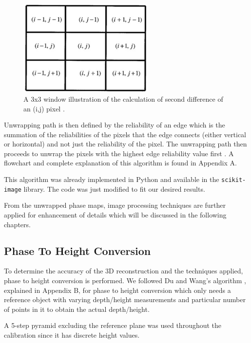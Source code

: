 \captionsetup[figure]{width=5in}
\begin{figure}[h!]
	\centering
	\includegraphics[width=0.6\textwidth]{figures/pixels.jpg}
	\caption{A 3x3 window illustration of the calculation of second difference of an (i,j) pixel \cite{Herraez2002}.}
	\label{fig:gammafactor}
\end{figure}


Unwrapping path is then defined by the reliability of an edge which is  the summation of the reliabilities of the pixels that the edge connects (either vertical or horizontal) and not just the reliability of the pixel. The unwrapping path then proceeds to unwrap the pixels with the highest edge reliability value first \cite{Herraez2002}. A flowchart and complete explanation of this algorithm is found in Appendix A.

This algorithm was already implemented in Python and available in the \texttt{scikit-image} library. The code was just modified to fit our desired results.

From the unwrapped phase maps, image processing techniques are further applied for enhancement of details which will be discussed in the following chapters.

\subsection{Phase To Height Conversion}

To determine the accuracy of the 3D reconstruction and the techniques applied, phase to height conversion is performed. We followed Du and Wang's algorithm \cite{Du2007}, explained in Appendix B, for phase to height conversion which only needs a reference object with varying depth/height measurements and particular number of points in it to obtain the actual depth/height.

A 5-step pyramid excluding the reference plane was used throughout the calibration since it has discrete height values.
